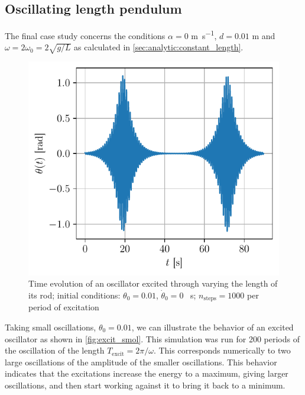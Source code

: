 \subsection{Oscillating length pendulum}
The final case study concerns the conditions $\alpha=0$ \si{\meter\per\second}, $d=0.01$ \si{\meter} and $\omega = 2\omega_0 = 2\sqrt{g/L}$ as calculated in \autoref{sec:analytic:constant_length}.

\begin{figure}
    \centering
    \includegraphics[width=\linewidth]{figures/excitation_smol_traj.pdf}
    \caption{Time evolution of an oscillator excited through varying the length of its rod; initial conditions: \mbox{$\theta_0 = 0.01$}, $\dot{\theta}_0 = 0$ \si{\per\second}; $n_\mathrm{steps} = 1000$ per period of excitation}
    \label{fig:excit_smol}
\end{figure}
Taking small oscillations, $\theta_0 = 0.01$, we can illustrate the behavior of an excited oscillator as shown in \autoref{fig:excit_smol}. This simulation was run for 200 periods of the oscillation of the length $T_\mathrm{excit} = 2\pi / \omega$. This corresponds numerically to two large oscillations of the amplitude of the smaller oscillations. This behavior indicates that the excitations increase the energy to a maximum, giving larger oscillations, and then start working against it to bring it back to a minimum.

